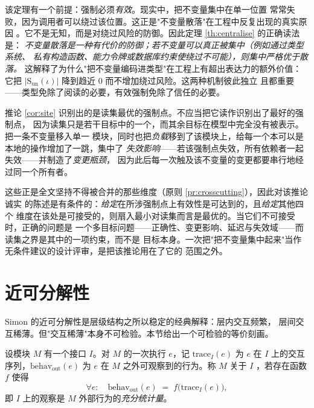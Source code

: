 \begin{remark}\label{rmk:central-limit}
该定理有一个前提：强制必须\emph{有效}。现实中，把不变量集中在单一位置
常常失败，因为调用者可以绕过该位置。这正是"不变量散落"在工程中反复出现的真实原因
。它不是无知，而是对绕过风险的防御。因此定理 \ref{th:centralise} 的正确读法是：
\emph{不变量散落是一种有代价的防御；若不变量可以真正被集中（例如通过类型系统、
私有构造函数、能力令牌或数据库约束使绕过不可能），则集中严格优于散落。}
这解释了为什么"把不变量编码进类型"在工程上有超出表达力的额外价值：它把
$|\mathrm{S}_{\mathrm{un}}(\iota)|$ 降到趋近 $0$ 而不增加绕过风险。这两种机制彼此独立
且都重要——类型免除了阅读的必要，有效强制免除了信任的必要。
\end{remark}

\begin{remark}[集中化只优化了若干目标中的一个]\label{rmk:central-multi}
推论 \ref{cor:site} 识别出的是读集最优的强制点。不应当把它读作识别出了最好的强制点，
因为读集只是若干目标中的一个，而其余目标在模型中完全没有被表示。把一条不变量移入单一
模块，同时也把\emph{负载}移到了该模块上，给每一个本可以是本地的操作增加了一跳，集中了
\emph{失效影响}——若该强制点失效，所有依赖者一起失效——并制造了\emph{变更瓶颈}，
因为此后每一次触及该不变量的变更都要串行地经过同一个所有者。

这些正是全文坚持不得被合并的那些维度（原则 \ref{pr:crosscutting}），因此对该推论诚实
的陈述是有条件的：\emph{给定}在所涉强制点上有效性是可达到的，且\emph{给定}其他四个
维度在该处是可接受的，则扇入最小对读集而言是最优的。当它们不可接受时，正确的问题是
一个多目标问题——正确性、变更影响、延迟与失效域——而读集之界是其中的一项约束，而不是
目标本身。一次把"把不变量集中起来"当作无条件建议的设计评审，是把该推论用在了它的
范围之外。
\end{remark}

\section{近可分解性}\label{sec:neardecomp}

Simon 的近可分解性\cite{simon1962}是层级结构之所以稳定的经典解释：层内交互频繁，
层间交互稀薄。但"交互稀薄"本身不可检验。本节给出一个可检验的等价刻画。

\begin{definition}[近可分解]\label{def:neardecomp}
设模块 $M$ 有一个接口 $I$。对 $M$ 的一次执行 $e$，记
$\mathrm{trace}_I(e)$ 为 $e$ 在 $I$ 上的交互序列，$\mathrm{behav}_{\mathrm{out}}(e)$
为 $e$ 在 $M$ 之外可观察到的行为。称 $M$ 关于 $I$ ，若存在函数 $f$
使得
\begin{equation}\label{eq:neardecomp}
\forall e:\quad \mathrm{behav}_{\mathrm{out}}(e) \;=\;
f\bigl(\mathrm{trace}_I(e)\bigr),
\end{equation}
即 $I$ 上的观察是 $M$ 外部行为的\emph{充分统计量}。
\end{definition}

